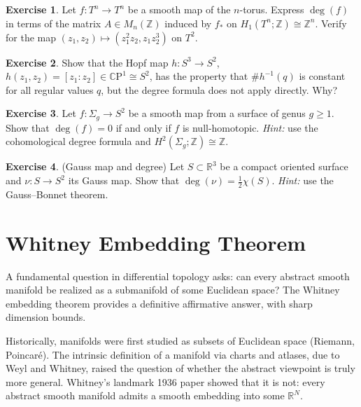 \documentclass[12pt,a4paper,openany]{book}
\theoremstyle{definition}
\newtheorem{exercise}{Exercise}[chapter]
\theoremstyle{remark}
\newcommand{\Z}{\mathbb{Z}}
\newcommand{\R}{\mathbb{R}}
\newcommand{\CP}{\mathbb{C}\mathrm{P}}
\begin{document}
\begin{exercise}\label{exo:degree-6}
Let $f\colon T^n \to T^n$ be a smooth map of the $n$-torus. Express
$\deg(f)$ in terms of the matrix $A \in M_n(\Z)$ induced by $f_*$
on $H_1(T^n;\Z)\cong\Z^n$. Verify for the map $(z_1,z_2)\mapsto(z_1^2 z_2, z_1 z_2^3)$ on $T^2$.
\end{exercise}

\begin{exercise}\label{exo:degree-7}
Show that the Hopf map $h\colon S^3\to S^2$, $h(z_1,z_2)=[z_1:z_2]\in\CP^1\cong S^2$,
has the property that $\#h^{-1}(q)$ is constant for all regular values $q$,
but the degree formula does not apply directly. Why?
\end{exercise}

\begin{exercise}\label{exo:degree-8}
Let $f\colon \Sigma_g \to S^2$ be a smooth map from a surface of genus
$g \ge 1$. Show that $\deg(f) = 0$ if and only if $f$ is null-homotopic.
\emph{Hint:} use the cohomological degree formula and $H^2(\Sigma_g;\Z)\cong\Z$.
\end{exercise}

\begin{exercise}\label{exo:degree-9}
(Gauss map and degree) Let $S \subset \R^3$ be a compact oriented surface
and $\nu\colon S \to S^2$ its Gauss map. Show that
$\deg(\nu) = \frac{1}{2}\chi(S)$.
\emph{Hint:} use the Gauss--Bonnet theorem.
\end{exercise}



\chapter{Whitney Embedding Theorem}\label{ch:whitney}
\minitoc\vspace{1cm}

A fundamental question in differential topology asks: can every abstract
smooth manifold be realized as a submanifold of some Euclidean space?
The Whitney embedding theorem provides a definitive affirmative answer,
with sharp dimension bounds.

Historically, manifolds were first studied as subsets of Euclidean space
(Riemann, Poincar\'{e}). The intrinsic definition of a manifold via
charts and atlases, due to Weyl and Whitney, raised the question of
whether the abstract viewpoint is truly more general. Whitney's landmark
1936 paper showed that it is not: every abstract smooth manifold admits
a smooth embedding into some $\R^N$.
\end{document}
